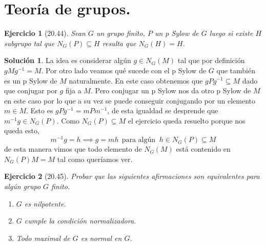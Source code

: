 \documentclass[11pt]{article}
\theoremstyle{plain}
\newtheorem*{ej}{Ejercicio}
\theoremstyle{definition}
\newtheorem*{sol}{Solución}
\theoremstyle{remark}
\begin{document}
\newpage
\section{Teoría de grupos.}


\begin{tcolorbox}[colback=teal!25!white,colframe=teal!75!black]
	\begin{ej}[20.44]
		Sean $G$ un grupo finito, $P$ un p Sylow de $G$ luego si existe $H$ subgrupo tal que $N_G(P) \subseteq H$ resulta que $N_G(H) = H$.
 	\end{ej}	
\end{tcolorbox}
\medskip

\begin{sol}
	La idea es considerar algún $g \in N_G(M)$ tal que por definición $gMg^{-1} = M$. Por otro lado veamos qué sucede con el p Sylow de $G$ que también es un p Sylow de $M$ naturalmente. En este caso obtenemos que $gPg^{-1} \subseteq M$ dado que conjugar por $g$ fija a $M$. Pero conjugar  un p Sylow nos da otro p Sylow de $M$ en este caso por lo que a su vez se puede conseguir conjugando por un elemento  $m \in M$. Esto es 	$gPg^{-1} = mPm^{-1}$, de esta igualdad se desprende que $m^{-1}g \in N_G(P)$. Como $N_G(P) \subseteq M$ el ejercicio queda resuelto porque nos queda esto,
	\[
	m^{-1}g=h \implies g=mh \ \ \text{para algún } \ h \in N_G(P) \subseteq M
	\]
	de esta manera vimos que todo elemento de $N_G(M)$ está contenido en $N_G(P)M = M$ tal como queríamos ver.	
\end{sol}
\bigskip

\begin{tcolorbox}[colback=teal!25!white,colframe=teal!75!black]
	\begin{ej}[20.45]
		Probar que las siguientes afirmaciones son equivalentes para algún grupo $G$ finito.
		\begin{enumerate}
		\item $G$ es nilpotente.
		\item $G$ cumple la condición normalizadora.
		\item Todo maximal de $G$ es normal en $G$.
		\end{enumerate}
	\end{ej}	
\end{tcolorbox}
\medskip
\end{document}

